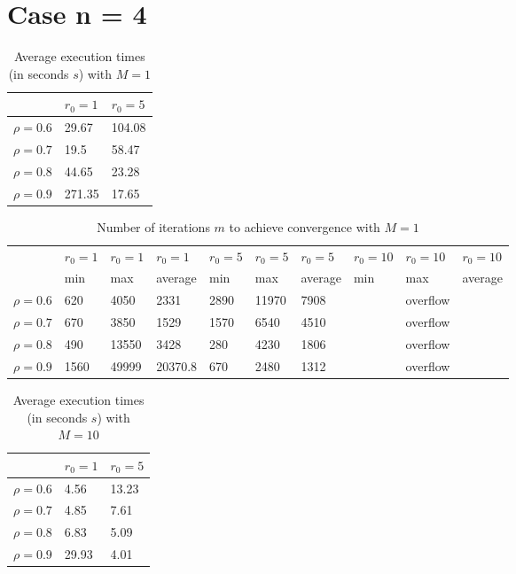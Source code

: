 \documentclass[a4paper,11pt,openright]{report}
\begin{document}
\section*{Case n = 4} 
\begin{table}[H]
\centering
\addtolength{\leftskip}{-1.5cm}
\addtolength{\rightskip}{-1.5cm}
\begin{tabular}{|c|ll|}
\hline
$ $ & $r_0 = 1$ & $r_0 = 5$ \\
\hline
$\rho = 0.6$ & 29.67 & 104.08 \\

$\rho = 0.7$ & 19.5 & 58.47 \\

$\rho = 0.8$ & 44.65 & 23.28 \\

$\rho = 0.9$ & 271.35 & 17.65 \\
\hline
\end{tabular}
\caption{Average execution
 times (in seconds $s$) with $M = 1$}
\end{table}
\begin{table}[H]
\centering
\addtolength{\leftskip}{-1.5cm}
\addtolength{\rightskip}{-1.5cm}
\begin{tabular}{|c|lllllllll|}
\hline
$ $ & $r_0 = 1$ & $r_0 = 1$ & $r_0 = 1$ & $r_0 = 5$ & $r_0 = 5$ & $r_0 = 5$ & $r_0 = 10$ & $r_0 = 10$ & $r_0 = 10$  \\
$ $ & min & max & average & min & max & average & min & max & average \\ 
\hline
$\rho = 0.6$ & 620 & 4050 & 2331 & 2890 & 11970 & 7908 &  & overflow &  \\

$\rho = 0.7$ & 670 & 3850 & 1529 & 1570 & 6540 & 4510 &  & overflow &  \\

$\rho = 0.8$ & 490 & 13550 & 3428 & 280 & 4230 & 1806 &  & overflow & \\

$\rho = 0.9$ & 1560 & 49999 & 20370.8 & 670 & 2480 & 1312 &  & overflow & \\
\hline
\end{tabular}
\caption{Number of iterations $m$ to achieve convergence with $M = 1$}
\end{table}
\begin{table}[H]
\centering
\addtolength{\leftskip}{-1.5cm}
\addtolength{\rightskip}{-1.5cm}
\begin{tabular}{|c|ll|}
\hline
$ $ & $r_0 = 1$ & $r_0 = 5$ \\
\hline
$\rho = 0.6$ & 4.56 & 13.23  \\

$\rho = 0.7$ & 4.85 & 7.61  \\

$\rho = 0.8$ & 6.83 & 5.09  \\

$\rho = 0.9$ & 29.93 & 4.01  \\
\hline
\end{tabular}
\caption{Average execution
 times (in seconds $s$) with $M = 10$}
\end{table}
\end{document}
